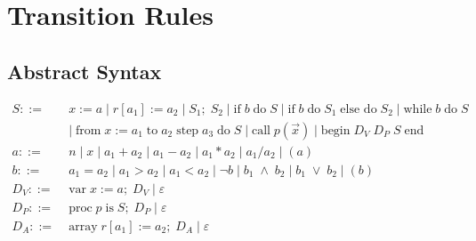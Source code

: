 

\chapter{Transition Rules}
\label{app:TransitionRules}

\section{Abstract Syntax}
\begin{align*}
S::= \; & x := a \; | \; r[a_1] := a_2 \; | \; S_1; \; S_2 \; | \; \text{if} \; b \; \text{do} \; S \; | \; \text{if} \; b \; \text{do} \; S_1 \; \text{else do} \; S_2 \; | \; \text{while} \; b \; \text{do} \; S \\
~ & | \; \text{from} \; x := a_1 \; \text{to} \; a_2 \; \text{step} \; a_3 \; \text{do} \; S \; | \; \text{call} \; p(\vec{x}) \; | \; \text{begin} \; D_V \; D_P \; S \; \text{end} \\
a::= \; & n \; | \; x \; | \; a_1 + a_2 \; | \; a_1 - a_2 \; | \; a_1 * a_2 \; | \; a_1 / a_2 \; | \; (a) \\
b::= \; &a_1 = a_2 \; | \; a_1 > a_2 \; | \; a_1 < a_2 \; | \; \neg b \; | \; b_1 \; \wedge \; b_2 \; | \; b_1 \; \vee \; b_2 \; | \; (b) \\
D_V::= \; & \text{var} \; x := a; \; D_V \; | \; \varepsilon \\
D_P::= \; & \text{proc} \; p \; \text{is} \; S;\;  D_P \; | \; \varepsilon \\
D_A::= \; & \text{array} \; r[a_1] := a_2; \; D_A \; | \; \varepsilon \\
\end{align*}


